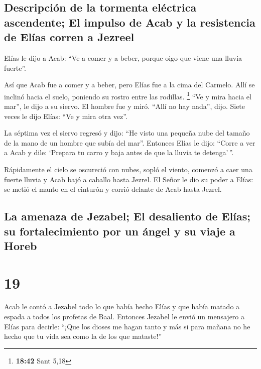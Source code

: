 \hypertarget{descripciuxf3n-de-la-tormenta-eluxe9ctrica-ascendente-el-impulso-de-acab-y-la-resistencia-de-eluxedas-corren-a-jezreel}{%
\subsection{Descripción de la tormenta eléctrica ascendente; El impulso
de Acab y la resistencia de Elías corren a
Jezreel}\label{descripciuxf3n-de-la-tormenta-eluxe9ctrica-ascendente-el-impulso-de-acab-y-la-resistencia-de-eluxedas-corren-a-jezreel}}

 Elías le dijo a Acab: ``Ve a comer y a beber, porque
oigo que viene una lluvia fuerte''.

 Así que Acab fue a comer y a beber, pero Elías fue a la
cima del Carmelo. Allí se inclinó hacia el suelo, poniendo su rostro
entre las rodillas. \footnote{\textbf{18:42} Sant 5,18} 
``Ve y mira hacia el mar'', le dijo a su siervo. El hombre fue y miró.
``Allí no hay nada'', dijo. Siete veces le dijo Elías: ``Ve y mira otra
vez''.

 La séptima vez el siervo regresó y dijo: ``He visto una
pequeña nube del tamaño de la mano de un hombre que subía del mar''.
Entonces Elías le dijo: ``Corre a ver a Acab y dile: `Prepara tu carro y
baja antes de que la lluvia te detenga'\,''.

 Rápidamente el cielo se oscureció con nubes, sopló el
viento, comenzó a caer una fuerte lluvia y Acab bajó a caballo hasta
Jezrel.  El Señor le dio su poder a Elías: se metió el
manto en el cinturón y corrió delante de Acab hasta Jezrel.

\hypertarget{la-amenaza-de-jezabel-el-desaliento-de-eluxedas-su-fortalecimiento-por-un-uxe1ngel-y-su-viaje-a-horeb}{%
\subsection{La amenaza de Jezabel; El desaliento de Elías; su
fortalecimiento por un ángel y su viaje a
Horeb}\label{la-amenaza-de-jezabel-el-desaliento-de-eluxedas-su-fortalecimiento-por-un-uxe1ngel-y-su-viaje-a-horeb}}

\hypertarget{section-18}{%
\section{19}\label{section-18}}

 Acab le contó a Jezabel todo lo que había hecho Elías y
que había matado a espada a todos los profetas de Baal. 
Entonces Jezabel le envió un mensajero a Elías para decirle: ``¡Que los
dioses me hagan tanto y más si para mañana no he hecho que tu vida sea
como la de los que mataste!''

